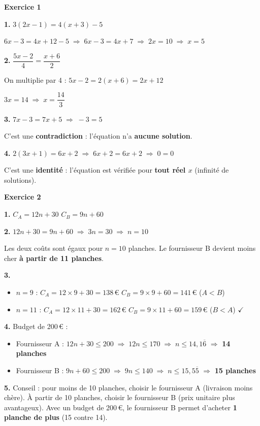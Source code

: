 \documentclass[a4paper,11pt]{article}
\begin{document}
\vspace{12pt}
\begin{correction}
\textbf{Exercice 1}

\textbf{1.} $3(2x - 1) = 4(x + 3) - 5$

$6x - 3 = 4x + 12 - 5 \;\Longrightarrow\; 6x - 3 = 4x + 7
  \;\Longrightarrow\; 2x = 10 \;\Longrightarrow\; x = 5$

\textbf{2.} $\dfrac{5x - 2}{4} = \dfrac{x + 6}{2}$

On multiplie par 4 : $5x - 2 = 2(x + 6) = 2x + 12$

$3x = 14 \;\Longrightarrow\; x = \dfrac{14}{3}$

\textbf{3.} $7x - 3 = 7x + 5 \;\Longrightarrow\; -3 = 5$

C'est une \textbf{contradiction} : l'équation n'a \textbf{aucune solution}.

\textbf{4.} $2(3x + 1) = 6x + 2 \;\Longrightarrow\; 6x + 2 = 6x + 2 \;\Longrightarrow\; 0 = 0$

C'est une \textbf{identité} : l'équation est vérifiée pour \textbf{tout réel $x$} (infinité de solutions).

\bigskip
\textbf{Exercice 2}

\textbf{1.} $C_A = 12n + 30$ \qquad $C_B = 9n + 60$

\textbf{2.} $12n + 30 = 9n + 60 \;\Longrightarrow\; 3n = 30 \;\Longrightarrow\; n = 10$

Les deux coûts sont égaux pour $n = 10$ planches. Le fournisseur B devient moins cher \textbf{à partir de 11 planches}.

\textbf{3.}
\begin{itemize}[nosep]
  \item $n = 9$ : $C_A = 12 \times 9 + 30 = 138$\,\euro{} \quad $C_B = 9 \times 9 + 60 = 141$\,\euro{} \quad ($A < B$)
  \item $n = 11$ : $C_A = 12 \times 11 + 30 = 162$\,\euro{} \quad $C_B = 9 \times 11 + 60 = 159$\,\euro{} \quad ($B < A$) \quad $\checkmark$
\end{itemize}

\textbf{4.} Budget de 200\,\euro{} :
\begin{itemize}[nosep]
  \item Fournisseur A : $12n + 30 \leq 200 \;\Longrightarrow\; 12n \leq 170 \;\Longrightarrow\; n \leq 14{,}1\overline{6}$ \quad $\Rightarrow$ \textbf{14 planches}
  \item Fournisseur B : $9n + 60 \leq 200 \;\Longrightarrow\; 9n \leq 140 \;\Longrightarrow\; n \leq 15{,}5\overline{5}$ \quad $\Rightarrow$ \textbf{15 planches}
\end{itemize}

\textbf{5.} Conseil : pour moins de 10 planches, choisir le fournisseur A (livraison moins chère). À partir de 10 planches, choisir le fournisseur B (prix unitaire plus avantageux). Avec un budget de 200\,\euro{}, le fournisseur B permet d'acheter \textbf{1 planche de plus} (15 contre 14).
\end{correction}
\end{document}
